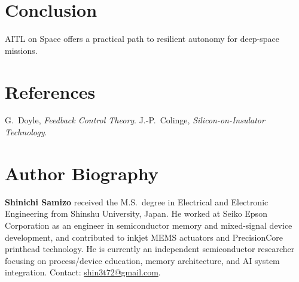 \documentclass[conference]{IEEEtran}
\begin{document}
\section{Conclusion}
AITL on Space offers a practical path to resilient autonomy
for deep-space missions.

\section*{References}
\begin{thebibliography}{99}
 G.~Doyle, \emph{Feedback Control Theory}.
 J.-P.~Colinge, \emph{Silicon-on-Insulator Technology}.
\end{thebibliography}

\section*{Author Biography}
\noindent
\textbf{Shinichi Samizo} received the M.S.\ degree in Electrical
and Electronic Engineering from Shinshu University, Japan.
He worked at Seiko Epson Corporation as an engineer in semiconductor
memory and mixed-signal device development, and contributed to inkjet
MEMS actuators and PrecisionCore printhead technology. He is currently
an independent semiconductor researcher focusing on process/device
education, memory architecture, and AI system integration.
Contact: \href{mailto:shin3t72@gmail.com}{shin3t72@gmail.com}.
\end{document}
